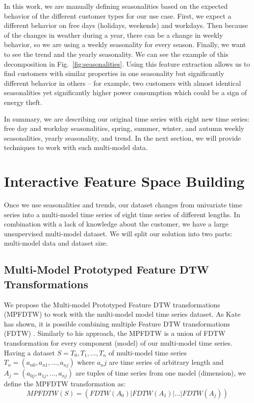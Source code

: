 In this work, we are manually defining seasonalities based on the expected behavior of the different customer types for our use case. First, we expect a different behavior on free days (holidays, weekends) and workdays. Then because of the changes in weather during a year, there can be a change in weekly behavior, so we are using a weekly seasonality for every season. Finally, we want to see the trend and the yearly seasonality. We can see the example of this decomposition in Fig.~\ref{fig:seasonalities}. Using this feature extraction allows us to find customers with similar properties in one seasonality but significantly different behavior in others -- for example, two customers with almost identical seasonalities yet significantly higher power consumption which could be a sign of energy theft.

In summary, we are describing our original time series with eight new time series: free day and workday seasonalities, spring, summer, winter, and autumn weekly seasonalities, yearly seasonality, and trend. In the next section, we will provide techniques to work with such multi-model data.

\section{Interactive Feature Space Building}
Once we use seasonalities and trends, our dataset changes from univariate time series into a multi-model time series of eight time series of different lengths. In combination with a lack of knowledge about the customer, we have a large unsupervised multi-model dataset. We will split our solution into two parts: multi-model data and dataset size.

\subsection{Multi-Model Prototyped Feature DTW Transformations}
We propose the Multi-model Prototyped Feature DTW transformations (MPFDTW) to work with the multi-model model time series dataset. As Kate has shown, it is possible combining multiple Feature DTW transformations (FDTW) \cite{met:fDTW}. Similarly to his approach, the MPFDTW is a union of FDTW transformation for every component (model) of our multi-model time series. Having a dataset $S = {T_0, T_1, \dots, T_n}$ of multi-model time series $T_n = (a_{n0}, a_{n1}, \dots, a_{nj})$ where $a_nj$ are time series of arbitrary length and $A_j = (a_{0j}, a_{1j}, \dots, a_{nj})$ are tuples of time series from one model (dimension), we define the MPFDTW transformation as:
\begin{equation}
 MPFDTW(S) = ( FDTW(A_{0}) | FDTW(A_{1}) | \dots | FDTW(A_{j}) )
\end{equation}

